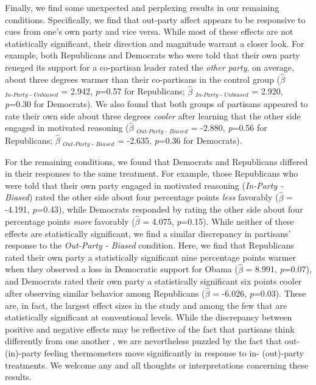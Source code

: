 \documentclass[12pt, letterpaper]{article}
\begin{document}
Finally, we find some unexpected and perplexing results in our remaining conditions. Specifically, we find that out-party affect appears to be responsive to cues from one's own party and vice versa. While most of these effects are not statistically significant, their direction and magnitude warrant a closer look. For example, both Republicans and Democrats who were told that their own party reneged its support for a co-partisan leader rated the \textit{other party}, on average, about three degrees warmer than their co-partisans in the control group ($\hat{\beta}$ $_{\textit{In-Party - Unbiased}}$ = 2.942, \textit{p}=0.57 for Republicans; $\hat{\beta}$ $_{\textit{In-Party - Unbiased}}$ = 2.920, \textit{p}=0.30 for Democrats). We also found that both groups of partisans appeared to rate their own side about three degrees \textit{cooler} after learning that the other side engaged in motivated reasoning ($\hat{\beta}$ $_{\textit{Out-Party - Biased}}$ = -2.880, \textit{p}=0.56 for Republicans; $\hat{\beta}$ $_{\textit{Out-Party - Biased}}$ = -2.635, \textit{p}=0.36 for Democrats). 

For the remaining conditions, we found that Democrats and Republicans differed in their responses to the same treatment. For example, those Republicans who were told that their own party engaged in motivated reasoning (\textit{In-Party - Biased}) rated the other side about four percentage points \textit{less} favorably ($\hat{\beta}$ = -4.191, \textit{p}=0.43), while Democrats responded by rating the other side about four percentage points \textit{more} favorably ($\hat{\beta}$ = 4.075, \textit{p}=0.15). While neither of these effects are statistically significant, we find a similar discrepancy in partisans' response to the \textit{Out-Party - Biased} condition. Here, we find that Republicans rated their own party a statistically significant nine percentage points warmer when they observed a loss in Democratic support for Obama ($\hat{\beta}$ = 8.991, \textit{p}=0.07), and Democrats rated their own party a statistically significant six points cooler after observing similar behavior among Republicans ($\hat{\beta}$ = -6.026, \textit{p}=0.03). These are, in fact, the largest effect sizes in the study and among the few that are statistically significant at conventional levels. While the discrepancy between positive and negative effects may be reflective of the fact that partisans think differently from one another \citep{grossmanhopkins_2016}, we are nevertheless puzzled by the fact that out- (in)-party feeling thermometers move significantly in response to in- (out)-party treatments. We welcome any and all thoughts or interpretations concerning these results. 
\end{document}
